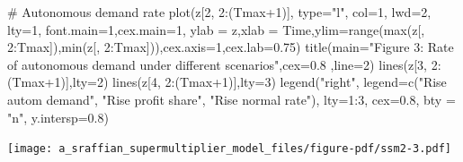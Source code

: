 \documentclass[
  letterpaper,
  DIV=11,
  numbers=noendperiod]{scrreprt}
\newenvironment{Shaded}{\begin{snugshade}}{\end{snugshade}}
\newcommand{\AttributeTok}[1]{\textcolor[rgb]{0.40,0.45,0.13}{#1}}
\newcommand{\CommentTok}[1]{\textcolor[rgb]{0.37,0.37,0.37}{#1}}
\newcommand{\DecValTok}[1]{\textcolor[rgb]{0.68,0.00,0.00}{#1}}
\newcommand{\FloatTok}[1]{\textcolor[rgb]{0.68,0.00,0.00}{#1}}
\newcommand{\FunctionTok}[1]{\textcolor[rgb]{0.28,0.35,0.67}{#1}}
\newcommand{\NormalTok}[1]{\textcolor[rgb]{0.00,0.23,0.31}{#1}}
\newcommand{\SpecialCharTok}[1]{\textcolor[rgb]{0.37,0.37,0.37}{#1}}
\newcommand{\StringTok}[1]{\textcolor[rgb]{0.13,0.47,0.30}{#1}}
\begin{document}
\begin{Shaded}
\begin{Highlighting}[]
\CommentTok{\# Autonomous demand rate}
\FunctionTok{plot}\NormalTok{(z[}\DecValTok{2}\NormalTok{, }\DecValTok{2}\SpecialCharTok{:}\NormalTok{(Tmax}\SpecialCharTok{+}\DecValTok{1}\NormalTok{)], }\AttributeTok{type=}\StringTok{"l"}\NormalTok{, }\AttributeTok{col=}\DecValTok{1}\NormalTok{, }\AttributeTok{lwd=}\DecValTok{2}\NormalTok{, }\AttributeTok{lty=}\DecValTok{1}\NormalTok{, }\AttributeTok{font.main=}\DecValTok{1}\NormalTok{,}\AttributeTok{cex.main=}\DecValTok{1}\NormalTok{, }
     \AttributeTok{ylab =} \StringTok{\textquotesingle{}z\textquotesingle{}}\NormalTok{,}\AttributeTok{xlab =} \StringTok{\textquotesingle{}Time\textquotesingle{}}\NormalTok{,}\AttributeTok{ylim=}\FunctionTok{range}\NormalTok{(}\FunctionTok{max}\NormalTok{(z[, }\DecValTok{2}\SpecialCharTok{:}\NormalTok{Tmax]),}\FunctionTok{min}\NormalTok{(z[, }\DecValTok{2}\SpecialCharTok{:}\NormalTok{Tmax])),}\AttributeTok{cex.axis=}\DecValTok{1}\NormalTok{,}\AttributeTok{cex.lab=}\FloatTok{0.75}\NormalTok{)}
\FunctionTok{title}\NormalTok{(}\AttributeTok{main=}\StringTok{"Figure 3: Rate of autonomous demand under different scenarios"}\NormalTok{,}\AttributeTok{cex=}\FloatTok{0.8}\NormalTok{ ,}\AttributeTok{line=}\DecValTok{2}\NormalTok{)}
\FunctionTok{lines}\NormalTok{(z[}\DecValTok{3}\NormalTok{, }\DecValTok{2}\SpecialCharTok{:}\NormalTok{(Tmax}\SpecialCharTok{+}\DecValTok{1}\NormalTok{)],}\AttributeTok{lty=}\DecValTok{2}\NormalTok{)}
\FunctionTok{lines}\NormalTok{(z[}\DecValTok{4}\NormalTok{, }\DecValTok{2}\SpecialCharTok{:}\NormalTok{(Tmax}\SpecialCharTok{+}\DecValTok{1}\NormalTok{)],}\AttributeTok{lty=}\DecValTok{3}\NormalTok{)}
\FunctionTok{legend}\NormalTok{(}\StringTok{"right"}\NormalTok{, }\AttributeTok{legend=}\FunctionTok{c}\NormalTok{(}\StringTok{"Rise autom demand"}\NormalTok{, }\StringTok{"Rise profit share"}\NormalTok{, }\StringTok{"Rise normal rate"}\NormalTok{),}
       \AttributeTok{lty=}\DecValTok{1}\SpecialCharTok{:}\DecValTok{3}\NormalTok{, }\AttributeTok{cex=}\FloatTok{0.8}\NormalTok{, }\AttributeTok{bty =} \StringTok{"n"}\NormalTok{, }\AttributeTok{y.intersp=}\FloatTok{0.8}\NormalTok{)}
\end{Highlighting}
\end{Shaded}

\texttt{[image: a\_sraffian\_supermultiplier\_model\_files/figure-pdf/ssm2-3.pdf]}
\end{document}

